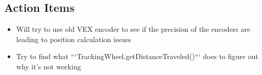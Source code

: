 \subsection{Action Items}
\begin{itemize}
    \item Will try to use old VEX encoder to see if the precision of the encoders are leading to position calculation issues
    \item Try to find what ```TrackingWheel.getDistanceTraveled()``` does to figure out why it's not working
\end{itemize}